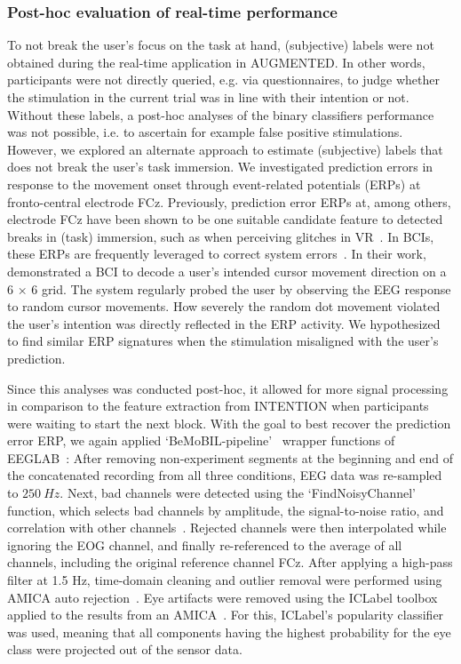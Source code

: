 \subsubsection{Post-hoc evaluation of real-time performance}
To not break the user's focus on the task at hand, (subjective) labels were not obtained during the real-time application in AUGMENTED. In other words, participants were not directly queried, e.g. via questionnaires, to judge whether the stimulation in the current trial was in line with their intention or not. Without these labels, a post-hoc analyses of the binary classifiers performance was not possible, i.e. to ascertain for example false positive stimulations. However, we explored an alternate approach to estimate (subjective) labels that does not break the user's task immersion. We investigated prediction errors in response to the movement onset through event-related potentials (ERPs) at fronto-central electrode FCz. Previously, prediction error ERPs at, among others, electrode FCz have been shown to be one suitable candidate feature to detected breaks in (task) immersion, such as when perceiving glitches in VR~\cite{Gehrke2019-og, Gehrke2022-kz, Gehrke2024-xq, Terfurth2024-kh, Si-mohammed2020-ru}. In BCIs, these ERPs are frequently leveraged to correct system errors~\cite{Zander2016-ed}. In their work,~\citet{Zander2016-ed} demonstrated a BCI to decode a user’s intended cursor movement direction on a 6 × 6 grid. The system regularly probed the user by observing the EEG response to random cursor movements. How severely the random dot movement violated the user’s intention was directly reflected in the ERP activity. We hypothesized to find similar ERP signatures when the stimulation misaligned with the user's prediction.

Since this analyses was conducted post-hoc, it allowed for more signal processing in comparison to the feature extraction from INTENTION when participants were waiting to start the next block. With the goal to best recover the prediction error ERP, we again applied `BeMoBIL-pipeline'~\cite{Klug2022-lc} wrapper functions of EEGLAB~\cite{Delorme2004-sn}: After removing non-experiment segments at the beginning and end of the concatenated recording from all three conditions, EEG data was re-sampled to $250~Hz$. Next, bad channels were detected using the `FindNoisyChannel' function, which selects bad channels by amplitude, the signal-to-noise ratio, and correlation with other channels~\cite{Bigdely-Shamlo2015-ds}. Rejected channels were then interpolated while ignoring the EOG channel, and finally re-referenced to the average of all channels, including the original reference channel FCz. After applying a high-pass filter at 1.5 Hz, time-domain cleaning and outlier removal were performed using AMICA auto rejection~\cite{Palmer2011-zs}. Eye artifacts were removed using the ICLabel toolbox applied to the results from an AMICA~\cite{Pion-Tonachini2019-fy}. For this, ICLabel's popularity classifier was used, meaning that all components having the highest probability for the eye class were projected out of the sensor data.


